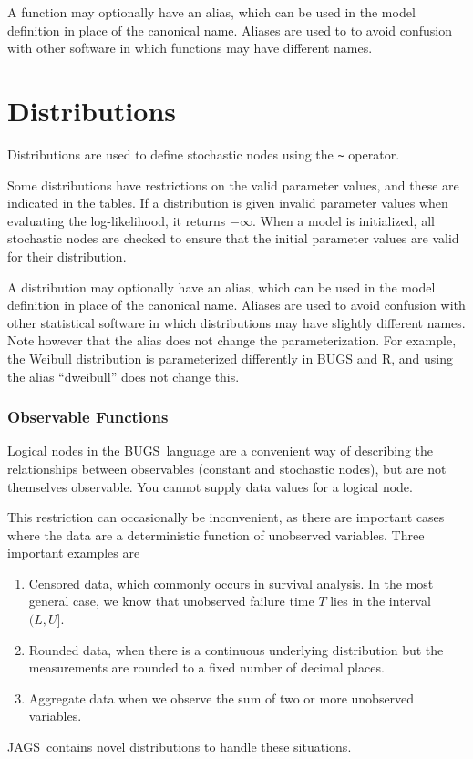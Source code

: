 \documentclass[11pt, a4paper, titlepage]{report}
\newcommand{\JAGS}{\textsf{JAGS}}
\newcommand{\BUGS}{\textsf{BUGS}}
\begin{document}
A function may optionally have an alias, which can be used in the
model definition in place of the canonical name. Aliases are used to
to avoid confusion with other software in which functions may have
different names.

\chapter{Distributions}
\label{chapter:distributions}

Distributions are used to define stochastic nodes using the \verb+~+
operator.

Some distributions have restrictions on the valid parameter values,
and these are indicated in the tables. If a distribution is
given invalid parameter values when evaluating the log-likelihood, it
returns $-\infty$. When a model is initialized, all stochastic nodes
are checked to ensure that the initial parameter values are valid for
their distribution.

A distribution may optionally have an alias, which can be used in the
model definition in place of the canonical name. Aliases are used to
avoid confusion with other statistical software in which distributions
may have slightly different names. Note however that the alias does
not change the parameterization. For example, the Weibull distribution
is parameterized differently in BUGS and R, and using the alias
``dweibull'' does not change this.

\subsection{Observable Functions}
\label{section:obfun}

Logical nodes in the \BUGS\ language are a convenient way of
describing the relationships between observables (constant and
stochastic nodes), but are not themselves observable. You cannot
supply data values for a logical node.  

This restriction can occasionally be inconvenient, as there are
important cases where the data are a deterministic function of
unobserved variables.  Three important examples are
\begin{enumerate}
\item Censored data, which commonly occurs in survival analysis. In
the most general case, we know that unobserved failure time $T$
lies in the interval $(L,U]$.
\item Rounded data, when there is a continuous underlying distribution
but the measurements are rounded to a fixed number of decimal places.
\item Aggregate data when we observe the sum of two or more
unobserved variables.
\end{enumerate}
\JAGS\ contains novel distributions to handle these situations.  
\end{document}
